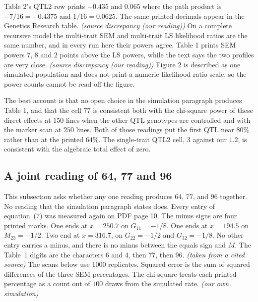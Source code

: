 \documentclass[11pt]{article}
\newcommand{\ev}[1]{\textup{\emph{(#1)}}}
\begin{document}
Table 2's QTL2 row prints $-0.435$ and $0.065$ where the path product is
$-7/16=-0.4375$ and $1/16=0.0625$. The same printed decimals appear in the
Genetics Research table. \ev{source discrepancy (our reading)}
On a complete recursive model the multi-trait SEM and multi-trait LS
likelihood ratios are the same number, and in every run here their powers
agree. Table 1 prints SEM powers $7$, $8$ and $2$ points above the LS
powers, while the text says the two profiles are very close.
\ev{source discrepancy (our reading)}
Figure 2 is described as one simulated population and does not print a
numeric likelihood-ratio scale, so the power counts cannot be read off the
figure.

The best account is that no open choice in the simulation paragraph
produces Table 1, and that the cell $77$ is consistent both with the
chi-square power of these direct effects at $150$ lines when the other QTL
genotypes are controlled and with the marker scan at $250$ lines. Both of
those readings put the first QTL near $80\%$ rather than at the printed
$64\%$. The single-trait QTL2 cell, $3$ against our $1.2$, is consistent
with the algebraic total effect of zero.

\subsection{A joint reading of 64, 77 and 96}
\label{sec:qtl1}

This subsection asks whether any one reading produces 64, 77, and 96
together. No reading that the simulation paragraph states does. Every entry of equation~(7) was measured again on PDF page 10.
The minus signs are four printed marks. One ends at $x=250.7$ on $G_{11}=-1/8$.
One ends at $x=194.5$ on $M_{23}=-1/2$. Two end at $x=316.7$, on
$G_{22}=-1/2$ and $G_{32}=-1/8$. No other entry carries a minus, and there is
no minus between the equals sign and $M$. The Table~1 digits are the
characters 6 and 4, then 77, then 96. \ev{taken from a cited source}
The scans below use $1000$ replicates. Squared error is the sum of squared
differences of the three SEM percentages. The chi-square treats each printed
percentage as a count out of $100$ draws from the simulated rate.
\ev{our own simulation}
\end{document}

